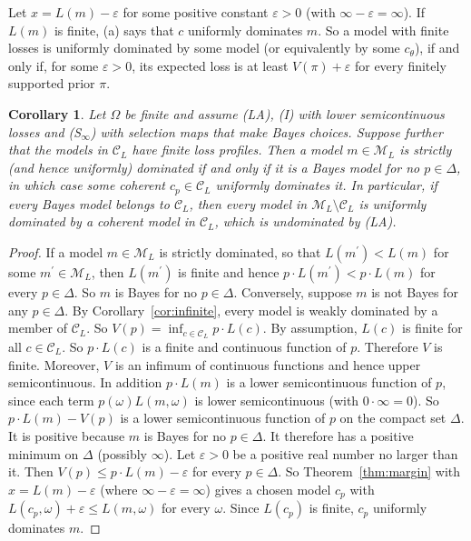 \documentclass[11pt]{article}
\newtheorem{corollary}[theorem]{Corollary}
\theoremstyle{definition}
\theoremstyle{remark}
\newcommand{\M}{\mathcal M}
\newcommand{\C}{\mathcal C}
\begin{document}
Let $x=L(m)-\varepsilon$ for some positive constant $\varepsilon>0$ (with $\infty-\varepsilon=\infty$). If $L(m)$ is finite, (a) says that $c$ uniformly dominates $m$. So a model with finite losses is uniformly dominated by some model (or equivalently by some $c_\theta$), if and only if, for some $\varepsilon>0$, its expected loss is at least $V(\pi)+\varepsilon$ for every finitely supported prior $\pi$.



\begin{corollary}\label{cor:strict}
Let $\Omega$ be finite and assume (LA), (I) with lower semicontinuous losses and (S$_\infty$) with selection maps that make Bayes choices.  Suppose further that the models in $\C_L$ have finite loss profiles. Then a model $m\in\M_L$ is strictly (and hence uniformly) dominated if and only if it is a Bayes model for no $p\in\Delta$, in which case some coherent $c_p\in\C_L$ uniformly dominates it. In particular, if every Bayes model belongs to $\C_L$, then every model in $\M_L\setminus\C_L$ is uniformly dominated by a coherent model in $\C_L$, which is undominated by (LA).
\end{corollary}
\begin{proof}
If a model $m\in\M_L$ is strictly dominated, so that $L(m^\prime)<L(m)$ for some $m^\prime\in\M_L$, then $L(m^\prime)$ is finite and hence $p\cdot L(m^\prime)<p\cdot L(m)$ for every $p\in\Delta$. So $m$ is Bayes for no $p\in\Delta$. Conversely, suppose $m$ is not Bayes for any $p\in\Delta$. By Corollary~\ref{cor:infinite}, every model is weakly dominated by a member of $\C_L$. So $V(p)=\inf_{c\in\C_L}p\cdot L(c)$. By assumption, $L(c)$ is finite for all $c\in\C_L$. So $p\cdot L(c)$ is a finite and continuous function of $p$. Therefore $V$ is finite. Moreover, $V$ is an infimum of continuous functions and hence upper semicontinuous. In addition $p\cdot L(m)$ is a lower semicontinuous function of $p$, since each term $p(\omega) L(m,\omega)$ is lower semicontinuous (with $0\cdot\infty=0$). So $p\cdot L(m)-V(p)$ is a lower semicontinuous function of $p$ on the compact set $\Delta$. It is positive because $m$ is Bayes for no $p\in\Delta$. It therefore has a positive minimum on $\Delta$ (possibly $\infty$). Let $\varepsilon>0$ be a positive real number no larger than it. Then $V(p)\le p\cdot L(m)-\varepsilon$ for every $p\in\Delta$. So Theorem~\ref{thm:margin} with $x=L(m)-\varepsilon$ (where $\infty-\varepsilon=\infty$) gives a chosen model $c_p$ with $L(c_p,\omega)+\varepsilon\le L(m,\omega)$ for every $\omega$. Since $L(c_p)$ is finite, $c_p$ uniformly dominates $m$.
\end{proof}
\end{document}
